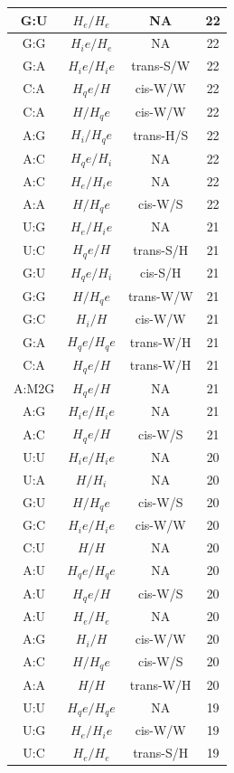 \begin{center}
\begin{longtable}{c|c|c|c}
G:U & $H_e/H_e$ & NA & 22 \\  \hline
G:G & $H_ie/H_e$ & NA & 22 \\  \hline
G:A & $H_ie/H_ie$ & trans-S/W & 22 \\  \hline
C:A & $H_qe/H$ & cis-W/W & 22 \\  \hline
C:A & $H/H_qe$ & cis-W/W & 22 \\  \hline
A:G & $H_i/H_qe$ & trans-H/S & 22 \\  \hline
A:C & $H_qe/H_i$ & NA & 22 \\  \hline
A:C & $H_e/H_ie$ & NA & 22 \\  \hline
A:A & $H/H_qe$ & cis-W/S & 22 \\  \hline
U:G & $H_e/H_ie$ & NA & 21 \\  \hline
U:C & $H_qe/H$ & trans-S/H & 21 \\  \hline
G:U & $H_qe/H_i$ & cis-S/H & 21 \\  \hline
G:G & $H/H_qe$ & trans-W/W & 21 \\  \hline
G:C & $H_i/H$ & cis-W/W & 21 \\  \hline
G:A & $H_qe/H_qe$ & trans-W/H & 21 \\  \hline
C:A & $H_qe/H$ & trans-W/H & 21 \\  \hline
A:M2G & $H_qe/H$ & NA & 21 \\  \hline
A:G & $H_ie/H_ie$ & NA & 21 \\  \hline
A:C & $H_qe/H$ & cis-W/S & 21 \\  \hline
U:U & $H_ie/H_ie$ & NA & 20 \\  \hline
U:A & $H/H_i$ & NA & 20 \\  \hline
G:U & $H/H_qe$ & cis-W/S & 20 \\  \hline
G:C & $H_ie/H_ie$ & cis-W/W & 20 \\  \hline
C:U & $H/H$ & NA & 20 \\  \hline
A:U & $H_qe/H_qe$ & NA & 20 \\  \hline
A:U & $H_qe/H$ & cis-W/S & 20 \\  \hline
A:U & $H_e/H_e$ & NA & 20 \\  \hline
A:G & $H_i/H$ & cis-W/W & 20 \\  \hline
A:C & $H/H_qe$ & cis-W/S & 20 \\  \hline
A:A & $H/H$ & trans-W/H & 20 \\  \hline
U:U & $H_qe/H_qe$ & NA & 19 \\  \hline
U:G & $H_e/H_ie$ & cis-W/W & 19 \\  \hline
U:C & $H_e/H_e$ & trans-S/H & 19 \\  \hline

\end{longtable}
\end{center}
